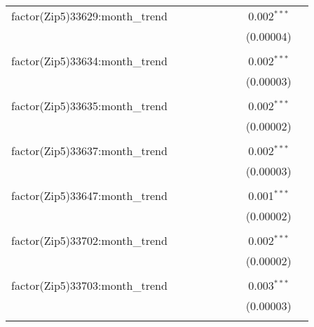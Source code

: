 \begin{table}[H]
{\begin{tabular}{@{\extracolsep{5pt}}lcccccccc}
  factor(Zip5)33629:month\_trend &  &  &  &  &  &  & 0.002$^{***}$ &  \\  

   &  &  &  &  &  &  & (0.00004) &  \\  

   & & & & & & & & \\  

  factor(Zip5)33634:month\_trend &  &  &  &  &  &  & 0.002$^{***}$ &  \\  

   &  &  &  &  &  &  & (0.00003) &  \\  

   & & & & & & & & \\  

  factor(Zip5)33635:month\_trend &  &  &  &  &  &  & 0.002$^{***}$ &  \\  

   &  &  &  &  &  &  & (0.00002) &  \\  

   & & & & & & & & \\  

  factor(Zip5)33637:month\_trend &  &  &  &  &  &  & 0.002$^{***}$ &  \\  

   &  &  &  &  &  &  & (0.00003) &  \\  

   & & & & & & & & \\  

  factor(Zip5)33647:month\_trend &  &  &  &  &  &  & 0.001$^{***}$ &  \\  

   &  &  &  &  &  &  & (0.00002) &  \\  

   & & & & & & & & \\  

  factor(Zip5)33702:month\_trend &  &  &  &  &  &  & 0.002$^{***}$ &  \\  

   &  &  &  &  &  &  & (0.00002) &  \\  

   & & & & & & & & \\  

  factor(Zip5)33703:month\_trend &  &  &  &  &  &  & 0.003$^{***}$ &  \\  

   &  &  &  &  &  &  & (0.00003) &  \\  

   & & & & & & & & \\  


\end{tabular}}
\end{table}
